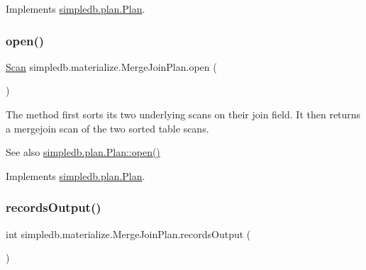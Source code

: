 Implements \hyperlink{interfacesimpledb_1_1plan_1_1Plan_a55094c16c756b0c09b5c71b94d573271}{simpledb.\+plan.\+Plan}.

\mbox{\label{classsimpledb_1_1materialize_1_1MergeJoinPlan_aa37bca23bb46556e265de8ed03c0e2e9}} 
\subsubsection{\texorpdfstring{open()}{open()}}
{\footnotesize\ttfamily \hyperlink{interfacesimpledb_1_1query_1_1Scan}{Scan} simpledb.\+materialize.\+Merge\+Join\+Plan.\+open (\begin{DoxyParamCaption}{ }\end{DoxyParamCaption})\hspace{0.3cm}{\ttfamily [inline]}}

The method first sorts its two underlying scans on their join field. It then returns a mergejoin scan of the two sorted table scans. \begin{DoxySeeAlso}{See also}
\hyperlink{interfacesimpledb_1_1plan_1_1Plan_aaa4c15cda4e9c0d52308850f9f13ff99}{simpledb.\+plan.\+Plan\+::open()} 
\end{DoxySeeAlso}


Implements \hyperlink{interfacesimpledb_1_1plan_1_1Plan_aaa4c15cda4e9c0d52308850f9f13ff99}{simpledb.\+plan.\+Plan}.

\mbox{\label{classsimpledb_1_1materialize_1_1MergeJoinPlan_a4491095a660740e251d50bd33628dc2d}} 
\subsubsection{\texorpdfstring{records\+Output()}{recordsOutput()}}
{\footnotesize\ttfamily int simpledb.\+materialize.\+Merge\+Join\+Plan.\+records\+Output (\begin{DoxyParamCaption}{ }\end{DoxyParamCaption})\hspace{0.3cm}{\ttfamily [inline]}}

